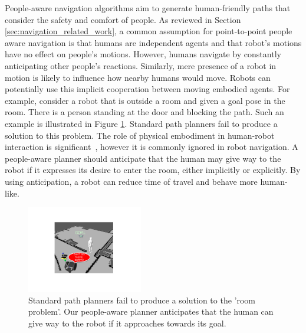 People-aware navigation algorithms aim to generate human-friendly paths that consider the safety and comfort of people. As reviewed in Section \ref{sec:navigation_related_work}, a common assumption for point-to-point people aware navigation is that humans are independent agents and that robot's motions have no effect on people's motions. However, humans navigate by constantly anticipating other people's reactions. Similarly, mere presence of a robot in motion is likely to influence how nearby humans would move. Robots can potentially use this implicit cooperation between moving embodied agents. For example, consider a robot that is outside a room and given a goal pose in the room. There is a person standing at the door and blocking the path. Such an example is illustrated in Figure \ref{fig:room}. Standard path planners fail to produce a solution to this problem. The role of physical embodiment in human-robot interaction is significant~\cite{wainer2006role}, however it is commonly ignored in robot navigation. A people-aware planner should anticipate that the human may give way to the robot if it expresses its desire to enter the room, either implicitly or explicitly. By using anticipation, a robot can reduce time of travel and behave more human-like.

\begin{figure}[t!]
\centering
\includegraphics[width=0.45\textwidth]{pics/room_crop}
\caption{Standard path planners fail to produce a solution to the 'room problem'. Our people-aware planner anticipates that the human can give way to the robot if it approaches towards its goal.}
\label{fig:room}
\end{figure}

